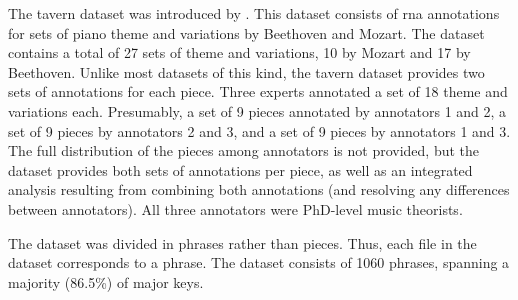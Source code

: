 

The \gls{tavern} dataset was introduced by
\textcite{devaney2015theme}. This dataset consists of
\gls{rna} annotations for sets of piano theme and variations
by Beethoven and Mozart. The dataset contains a total of 27
sets of theme and variations, 10 by Mozart and 17 by
Beethoven. Unlike most datasets of this kind, the
\gls{tavern} dataset provides two sets of annotations for
each piece. Three experts annotated a set of 18 theme and
variations each. Presumably, a set of 9 pieces annotated by
annotators 1 and 2, a set of 9 pieces by annotators 2 and 3,
and a set of 9 pieces by annotators 1 and 3. The full
distribution of the pieces among annotators is not provided,
but the dataset provides both sets of annotations per piece, as well
as an integrated analysis resulting from combining both
annotations (and resolving any differences between
annotators). All three annotators were PhD-level music
theorists.

The dataset was divided in phrases rather than pieces. Thus,
each file in the dataset corresponds to a phrase. The
dataset consists of 1060 phrases, spanning a majority
(86.5\%) of major keys.